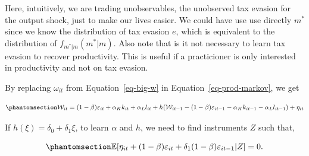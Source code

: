 \documentclass[
  12pt]{article}
\theoremstyle{definition}
\theoremstyle{remark}
\begin{document}
Here, intuitively, we are trading unobservables, the unobserved tax
evasion for the output shock, just to make our lives easier. We could
have use use directly \(m^*\) since we know the distribution of tax
evasion \(e\), which is equivalent to the distribution of
\(f_{m^*|m}(m^*|m)\). Also note that is it not necessary to learn tax
evasion to recover productivity. This is useful if a practicioner is
only interested in productivity and not on tax evasion.

By replacing \(\omega_{it}\) from Equation~\ref{eq-big-w} in
Equation~\ref{eq-prod-markov}, we get

\begin{equation}\phantomsection\label{eq-big-w-reg}{
\begin{aligned}
    \mathcal W_{it}=(1-\beta)\varepsilon_{it}+\alpha_K k_{it}+\alpha_L l_{it}+h(\mathcal W_{it-1}-(1-\beta)\varepsilon_{it-1}-\alpha_K k_{it-1}-\alpha_L l_{it-1})+\eta_{it}
\end{aligned}
}\end{equation}

If \(h(\xi)=\delta_0 +\delta_1\xi\), to learn \(\alpha\) and \(h\), we
need to find instruments \(Z\) such that,

\begin{equation}\phantomsection\label{eq-eta-moments}{
\mathbb{E}[\eta_{it}+(1-\beta)\varepsilon_{it}+\delta_1(1-\beta)\varepsilon_{it-1}|Z]=0.
}\end{equation}
\end{document}
